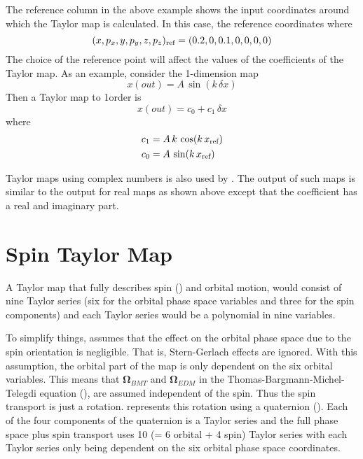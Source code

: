 The reference column in the above example shows the input coordinates around which the Taylor map is
calculated. In this case, the reference coordinates where
\begin{equation}
  (x, p_x, y, p_y, z, p_z)_{\text{ref}} = (0.2, 0, 0.1, 0, 0, 0, 0)
\end{equation}
The choice of the reference point will affect the values of the coefficients of the Taylor map. As
an example, consider the 1-dimension map
\begin{equation}
  x(out) = A \, \sin(k \, \delta x)
\end{equation}
Then a Taylor map to 1\St order is
\begin{equation}
  x(out) = c_0 + c_1 \, \delta x
\end{equation}
where
\begin{align}
  c_1 &= A \, k \, \cos(k \, x_{\text{ref}}) \\
  c_0 &= A \, \sin(k \, x_{\text{ref}})
\end{align}

Taylor maps using complex numbers is also used by \bmad. The output of such maps is similar to the
output for real maps as shown above except that the coefficient has a real and imaginary part.

\section{Spin Taylor Map}
\label{s:spin.map}

A Taylor map that fully describes spin () and orbital motion, would consist of nine
Taylor series (six for the orbital phase space variables and three for the spin components) and each
Taylor series would be a polynomial in nine variables.

To simplify things, \bmad assumes that the effect on the orbital phase space due to the spin
orientation is negligible. That is, Stern-Gerlach effects are ignored. With this assumption, the
orbital part of the map is only dependent on the six orbital variables. This means that
${\pmb\Omega}_{BMT}$ and ${\pmb\Omega}_{EDM}$ in the Thomas-Bargmann-Michel-Telegdi equation
(), are assumed independent of the spin. Thus the spin transport is just a rotation.
\bmad represents this rotation using a quaternion (). Each of the four components of
the quaternion is a Taylor series and the full phase space plus spin transport uses 10 (= 6 orbital
+ 4 spin) Taylor series with each Taylor series only being dependent on the six orbital phase space
coordinates.

